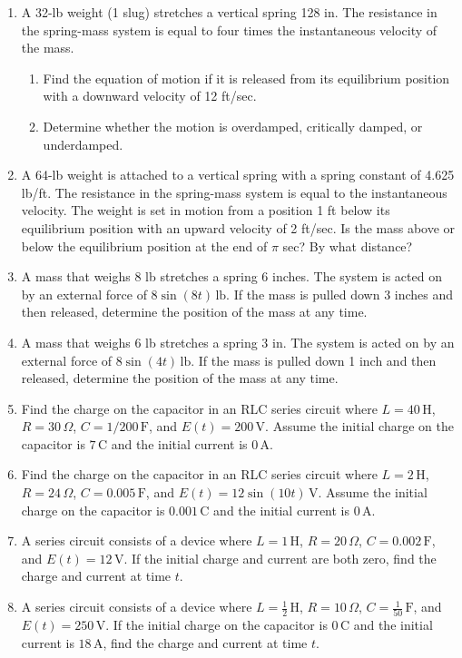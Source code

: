 \documentclass{exercises}
\begin{document}
\begin{enumerate}[start=1]
\begin{enumerate}[label=(\alph*)]
  \item Determine whether the motion is overdamped, critically damped, or underdamped.
\end{enumerate}
\item A 32-lb weight (1 slug) stretches a vertical spring 128 in. The resistance in the spring-mass system is equal to four times the instantaneous velocity of the mass.
\begin{enumerate}[label=(\alph*)]
  \item Find the equation of motion if it is released from its equilibrium position with a downward velocity of 12 ft/sec.
  \item Determine whether the motion is overdamped, critically damped, or underdamped.
\end{enumerate}
\item A 64-lb weight is attached to a vertical spring with a spring constant of 4.625 lb/ft. The resistance in the spring-mass system is equal to the instantaneous velocity. The weight is set in motion from a position 1 ft below its equilibrium position with an upward velocity of 2 ft/sec. Is the mass above or below the equilibrium position at the end of $\pi$ sec? By what distance?
\item A mass that weighs 8 lb stretches a spring 6 inches. The system is acted on by an external force of $8\sin(8t)\,\text{lb}$. If the mass is pulled down 3 inches and then released, determine the position of the mass at any time.
\item A mass that weighs 6 lb stretches a spring 3 in. The system is acted on by an external force of $8\sin(4t)\,\text{lb}$. If the mass is pulled down 1 inch and then released, determine the position of the mass at any time.
\item Find the charge on the capacitor in an RLC series circuit where $L=40\,\text{H}$, $R=30\,\Omega$, $C=1/200\,\text{F}$, and $E(t)=200\,\text{V}$. Assume the initial charge on the capacitor is $7\,\text{C}$ and the initial current is $0\,\text{A}$.
\item Find the charge on the capacitor in an RLC series circuit where $L=2\,\text{H}$, $R=24\,\Omega$, $C=0.005\,\text{F}$, and $E(t)=12\sin(10t)\,\text{V}$. Assume the initial charge on the capacitor is $0.001\,\text{C}$ and the initial current is $0\,\text{A}$.
\item A series circuit consists of a device where $L=1\,\text{H}$, $R=20\,\Omega$, $C=0.002\,\text{F}$, and $E(t)=12\,\text{V}$. If the initial charge and current are both zero, find the charge and current at time $t$.
\item A series circuit consists of a device where $L=\frac{1}{2}\,\text{H}$, $R=10\,\Omega$, $C=\frac{1}{50}\,\text{F}$, and $E(t)=250\,\text{V}$. If the initial charge on the capacitor is $0\,\text{C}$ and the initial current is $18\,\text{A}$, find the charge and current at time $t$.
\end{enumerate}
\end{document}
